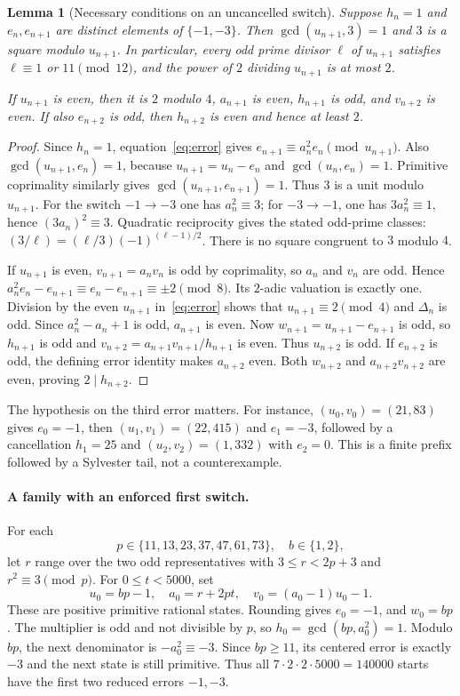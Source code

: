 \documentclass[11pt]{article}
\newtheorem{lemma}{Lemma}
\begin{document}
\begin{lemma}[Necessary conditions on an uncancelled switch]
Suppose $h_n=1$ and $e_n,e_{n+1}$ are distinct elements of
$\{-1,-3\}$. Then $\gcd(u_{n+1},3)=1$ and $3$ is a square
modulo $u_{n+1}$. In particular, every odd prime divisor $\ell$
of $u_{n+1}$ satisfies $\ell\equiv1$ or $11\pmod{12}$,
and the power of $2$ dividing $u_{n+1}$ is at most $2$.

If $u_{n+1}$ is even, then it is $2$ modulo $4$, $a_{n+1}$ is even,
$h_{n+1}$ is odd, and $v_{n+2}$ is even. If also $e_{n+2}$ is odd,
then $h_{n+2}$ is even and hence at least $2$.
\end{lemma}
\begin{proof}
Since $h_n=1$, equation~\eqref{eq:error} gives
$e_{n+1}\equiv a_n^2e_n\pmod{u_{n+1}}$.
Also $\gcd(u_{n+1},e_n)=1$, because $u_{n+1}=u_n-e_n$ and
$\gcd(u_n,e_n)=1$. Primitive coprimality similarly gives
$\gcd(u_{n+1},e_{n+1})=1$. Thus $3$ is a unit modulo $u_{n+1}$.
For the switch $-1\to-3$ one has $a_n^2\equiv3$;
for $-3\to-1$, one has $3a_n^2\equiv1$, hence
$(3a_n)^2\equiv3$. Quadratic reciprocity gives the stated odd-prime
classes: $(3/\ell)=(\ell/3)(-1)^{(\ell-1)/2}$.
There is no square congruent to $3$ modulo $4$.

If $u_{n+1}$ is even, $v_{n+1}=a_nv_n$ is odd by coprimality,
so $a_n$ and $v_n$ are odd. Hence
$a_n^2e_n-e_{n+1}\equiv e_n-e_{n+1}\equiv\pm2\pmod8$.
Its $2$-adic valuation is exactly one. Division by the even
$u_{n+1}$ in~\eqref{eq:error} shows that $u_{n+1}\equiv2\pmod4$
and $\Delta_n$ is odd. Since $a_n^2-a_n+1$ is odd,
$a_{n+1}$ is even. Now
$w_{n+1}=u_{n+1}-e_{n+1}$ is odd, so $h_{n+1}$ is odd and
$v_{n+2}=a_{n+1}v_{n+1}/h_{n+1}$ is even.
Thus $u_{n+2}$ is odd. If $e_{n+2}$ is odd, the defining error
identity makes $a_{n+2}$ even. Both $w_{n+2}$ and
$a_{n+2}v_{n+2}$ are even, proving $2\mid h_{n+2}$.
\end{proof}

The hypothesis on the third error matters. For instance,
$(u_0,v_0)=(21,83)$ gives $e_0=-1$, then
$(u_1,v_1)=(22,415)$ and $e_1=-3$, followed by a cancellation
$h_1=25$ and $(u_2,v_2)=(1,332)$ with $e_2=0$. This is a
finite prefix followed by a Sylvester tail, not a counterexample.

\paragraph{A family with an enforced first switch.}
For each
\[
 p\in\{11,13,23,37,47,61,73\},\quad b\in\{1,2\},
\]
let $r$ range over the two odd representatives with
$3\le r<2p+3$ and $r^2\equiv3\pmod p$. For
$0\le t<5000$, set
\[
 u_0=bp-1,\quad a_0=r+2pt,\quad
 v_0=(a_0-1)u_0-1.
\]
These are positive primitive rational states. Rounding gives $e_0=-1$,
and $w_0=bp$. The multiplier is odd and not divisible by $p$, so
$h_0=\gcd(bp,a_0^2)=1$. Modulo $bp$, the next denominator is
$-a_0^2\equiv-3$. Since $bp\ge11$, its centered error is exactly
$-3$ and the next state is still primitive. Thus all
$7\cdot2\cdot2\cdot5000=140000$ starts have the first two
reduced errors $-1,-3$.
\end{document}
